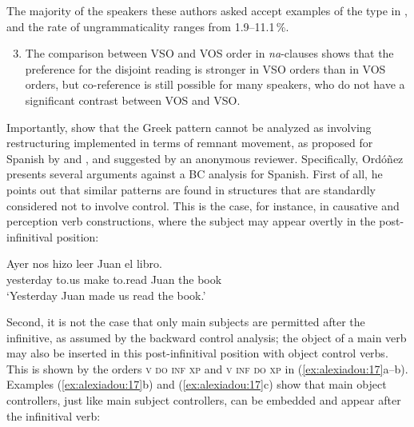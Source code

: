 \documentclass[output=paper]{langsci/langscibook}
\begin{document}
The majority of the speakers these authors asked accept examples of the type in , and the rate of ungrammaticality ranges from 1.9--11.1\,\%.  

\begin{enumerate}\setcounter{enumi}{2}
\item The comparison between VSO and VOS order in \textit{na}{}-clauses shows that the preference for the disjoint reading is stronger in VSO orders than in VOS orders, but co-reference is still possible for many speakers, who do not have a significant contrast between VOS and VSO. 
\end{enumerate}

Importantly, \citet{Tsakali2017} show that the Greek pattern cannot be analyzed as involving restructuring implemented in terms of remnant movement, as proposed for Spanish by \citet{Ordóñez2009} and \citet{Herbeck2013}, and suggested by an anonymous reviewer. Specifically, Ordóñez presents several arguments against a BC analysis for Spanish. First of all, he points out that similar patterns are found in structures that are standardly considered not to involve control. This is the case, for instance, in causative and perception verb constructions, where the subject may appear overtly in the post-infinitival position:

\ea%
    \label{ex:alexiadou:16}
    \gll Ayer     nos   hizo   leer   Juan   el libro.  \\
           yesterday   to.us   make   to.read Juan   the book  \\
    \glt   ‘Yesterday Juan made us read the book.’  
    \z

           

Second, it is not the case that only main subjects are permitted after the infinitive, as assumed by the backward control analysis; the object of a main verb may also be inserted in this post-infinitival position with object control verbs. This is shown by the orders \textsc{v do inf xp} and \textsc{v inf do xp} in (\ref{ex:alexiadou:17}a--b). Examples (\ref{ex:alexiadou:17}b) and (\ref{ex:alexiadou:17}c) show that main object controllers, just like main subject controllers, can be embedded and appear after the infinitival verb:

\ea%
    \label{ex:alexiadou:17}
    \z
\z    
\end{document}
